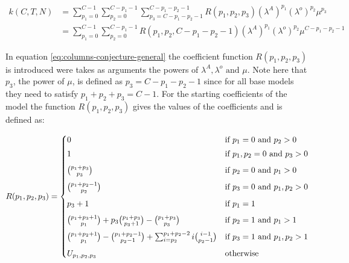 \begin{align}\label{eq:columns-conjecture-general}
    k(C,T,N) &= \sum_{p_1=0}^{C-1} \sum_{p_2=0}^{C-p_1-1} \sum_{p_3=C - p_1 - p_2 - 1}^{C - p_1 - p_2 - 1} R(p_1, p_2, p_3) (\lambda^A)^{p_1} (\lambda^o)^{p_2} \mu^{p_3} \nonumber \\ 
    &= \sum_{p_1=0}^{C-1} \sum_{p_2=0}^{C-p_1-1} R(p_1, p_2, C-p_1-p_2-1) (\lambda^A)^{p_1} (\lambda^o)^{p_2} \mu^{C-p_1-p_2-1} 
\end{align}

In equation \ref{eq:columns-conjecture-general} the coefficient function \(R(p_1,p_2,p_3)\) is introduced were takes as arguments the powers of \(\lambda^A, \lambda^o \text{ and } \mu\). 
Note here that \(p_3\), the power of \(\mu\), is defined as \(p_3=C-p_1-p_2-1\) since for all base models they need to satisfy \(p_1 + p_2 + p_3 = C-1\). 
For the starting coefficients of the model the function \(R(p_1,p_2,p_3)\) gives the values of the coefficients and is defined as:

\begin{equation} \label{eq:coefficient-function}
    R(p_1,p_2,p_3) = 
    \begin{cases}
        0 & \text{if } p_1 = 0 \text{ and } p_2 > 0 \vspace{0.1cm} \\
        1 & \text{if } p_1, p_2 = 0 \text{ and } p_3 > 0 \vspace{0.2cm} \\
        \binom{p_1 + p_3}{p_3} & \text{if } p_2 = 0 \text{ and } p_1 > 0 \vspace{0.2cm} \\
        \binom{p_1 + p_2 - 1}{p_2} & \text{if } p_3 = 0 \text{ and } p_1, p_2 > 0 \vspace{0.2cm} \\
        p_3 + 1 & \text{if } p_1 = 1 \vspace{0.2cm} \\
        \binom{p_1 + p_3 + 1}{p_1} + p_3 \binom{p_1 + p_3}{p_3+1} - \binom{p_1 + p_3}{p_3} & \text{if } p_2 = 1 \text{ and } p_1 > 1 \vspace{0.2cm} \\
        \binom{p_1 + p_2 + 1}{p_1} - \binom{p_1 + p_2 - 1}{p_2-1} + \sum_{i=p_2}^{p_1 + p_2 - 2} i \binom{i-1}{p_2 - 1} & \text{if } p_3 = 1 \text{ and } p_1,p_2 > 1 \vspace{0.2cm} \\
        U_{p_1,p_2,p_3} & \text{otherwise}
    \end{cases}
\end{equation}

